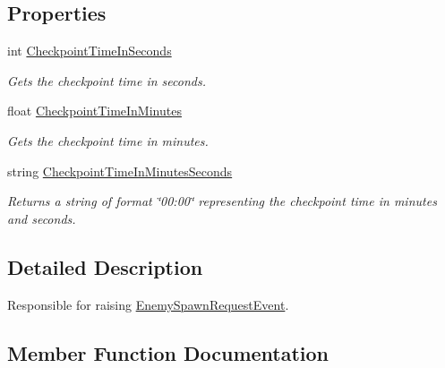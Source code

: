 \subsection*{Properties}
\begin{DoxyCompactItemize}
\item 
int \hyperlink{class_round_manager_1_1_round_checkpoint_a999618b6a717923fb7afd4b2d09e7f0c}{Checkpoint\+Time\+In\+Seconds}
\begin{DoxyCompactList}\small\item\em Gets the checkpoint time in seconds. \end{DoxyCompactList}\item 
float \hyperlink{class_round_manager_1_1_round_checkpoint_aab2ccb73ae364490337cf5aed2b5c954}{Checkpoint\+Time\+In\+Minutes}
\begin{DoxyCompactList}\small\item\em Gets the checkpoint time in minutes. \end{DoxyCompactList}\item 
string \hyperlink{class_round_manager_1_1_round_checkpoint_a3c3f6d3af9c4f8240c3005e1e3b98892}{Checkpoint\+Time\+In\+Minutes\+Seconds}
\begin{DoxyCompactList}\small\item\em Returns a string of format \char`\"{}00\+:00\char`\"{} representing the checkpoint time in minutes and seconds. \end{DoxyCompactList}\end{DoxyCompactItemize}


\subsection{Detailed Description}
Responsible for raising \hyperlink{class_round_manager_1_1_events_1_1_enemy_spawn_request_event}{Enemy\+Spawn\+Request\+Event}. 



\subsection{Member Function Documentation}
\hypertarget{class_round_manager_1_1_round_checkpoint_a8b8e190a0804b829e03baeec0b874718}{}
